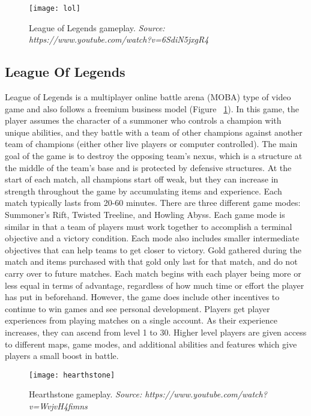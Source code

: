 \begin{figure}[h]
\centering
\texttt{[image: lol]}
\caption{League of Legends gameplay. \textit{Source: https://www.youtube.com/watch?v=6SdiN5jxgR4}}
\label{lol}
\end{figure}

\subsection{League Of Legends}

League of Legends is a multiplayer online battle arena (MOBA) type of video game and also follows a freemium business model  \cite{LeagueOfLegends} (Figure ~\ref{lol}). In this game, the player assumes the character of a summoner who controls a champion with unique abilities, and they battle with a team of other champions against another team of champions (either other live players or computer controlled). The main goal of the game is to destroy the opposing team's nexus, which is a structure at the middle of the team's base and is protected by defensive structures. At the start of each match, all champions start off weak, but they can increase in strength throughout the game by accumulating items and experience. Each match typically lasts from 20-60 minutes. There are three different game modes: Summoner's Rift, Twisted Treeline, and Howling Abyss. Each game mode is similar in that a team of players must work together to accomplish a terminal objective and a victory condition. Each mode also includes smaller intermediate objectives that can help teams to get closer to victory. 
	Gold gathered during the match and items purchased with that gold only last for that match, and do not carry over to future matches. Each match begins with each player being more or less equal in terms of advantage, regardless of how much time or effort the player has put in beforehand. 
	However, the game does include other incentives to continue to win games and see personal development. Players get player experiences from playing matches on a single account. As their experience increases, they can ascend from level 1 to 30. Higher level players are given access to different maps, game modes, and additional abilities and features which give players a small boost in battle. 
	
\begin{figure}[h]
\centering
\texttt{[image: hearthstone]}
\caption{Hearthstone gameplay. \textit{Source: https://www.youtube.com/watch?v=WvjvH4fimns}}
\label{hearthstone}
\end{figure}	

